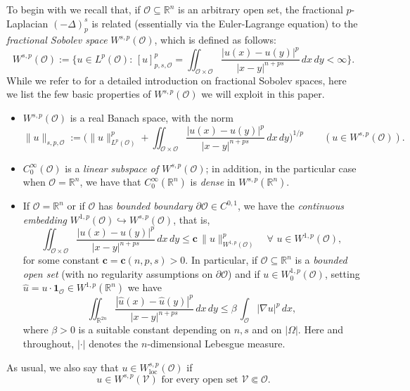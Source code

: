 \documentclass[11pt,a4paper]{amsart}
\def \R {\mathbb{R}}
\def \Oo {\mathcal{O}}
\theoremstyle{definition}
\theoremstyle{plain}
\numberwithin{equation}{section}
\begin{document}
To begin with we recall that, if $\mathcal{O}\subseteq\R^n$ is an arbitrary open set,
the {fractional $p$-Laplacian} $(-\Delta)_p^s$ is related
(essentially via the Euler-Lagrange equation)
to the \emph{fractional Sobolev space} $W^{s,p}(\Oo)$, which is defined as follows:
$$W^{s,p}(\Oo) := \Big\{u\in L^p(\Oo):\,[u]^p_{p,s,\Oo} = \iint_{\Oo\times\Oo}
\frac{|u(x)-u(y)|^p}{|x-y|^{n+ps}}\,dx\,dy < \infty\Big\}.$$
While we refer to \cite{LeoniFract} for a detailed introduction
on fractional Sobolev spaces, here we list the few basic properties of $W^{s,p}(\Oo)$
we will exploit in this paper.
\begin{itemize}
 \item[a)] $W^{s,p}(\Oo)$ is a real Banach space, with the norm
 $$\|u\|_{s,p,\Oo}
 := \Big(\|u\|^p_{L^p(\Oo)}+\iint_{\Oo\times\Oo}\frac{|u(x)-u(y)|^p}{|x-y|^{n+ps}}\,dx\,dy\Big)^{1/p}\qquad
 (u\in W^{s,p}(\Oo)).$$ 
 
 \item[b)] $C_0^\infty(\Oo)$ is a \emph{linear subspace of $W^{s,p}(\Oo)$}; in addition,
 in the particular case when $\Oo = \R^n$, we have that
  $C_0^\infty(\R^n)$ is \emph{dense} in $W^{s,p}(\R^n)$.
 \vspace*{0.1cm}
 
 \item[c)] If $\Oo = \R^n$ or if $\Oo$ has \emph{bounded boundary $\partial\Oo\in C^{0,1}$},
 we have the \emph{continuous embedding} $W^{1,p}(\Oo) \hookrightarrow W^{s,p}(\Oo)$,
 that is, 
 \begin{equation} \label{eq:H1embeddingHs}
  \iint_{\Oo\times\Oo}\frac{|u(x)-u(y)|^p}{|x-y|^{n+ps}}\,dx\,dy \leq 
  \mathbf{c}\,\|u\|^p_{W^{1,p}(\Oo)}\quad\text{$\forall\,\,u\in W^{1,p}(\Oo)$},
 \end{equation}
 for some constant $\mathbf{c} = \mathbf{c}(n,p,s) > 0$.
  In particular, if $\Oo\subseteq\R^n$ is a
  \emph{bounded open set} (with no regularity as\-sump\-tions on $\partial\Oo$) and
  if $u\in W_0^{1,p}(\Oo)$, set\-ting $\hat{u} = u\cdot\mathbf{1}_\Oo\in W^{1,p}(\R^n)$ we have
  \begin{equation} \label{eq:H01embeddingHs}
  \iint_{\R^{2n}}\frac{|\hat{u}(x)-\hat{u}(y)|^p}{|x-y|^{n+ps}}\,dx\,dy \leq 
  \beta\,\int_\Oo|\nabla u|^p\,dx,
 \end{equation}
 where $\beta > 0$ is a suitable constant depending on $n,s$ and on $|\Omega|$. Here
 and throughout,  $|\cdot|$ denotes the $n$-dimensional Lebesgue measure.
\end{itemize}
As usual, we also say that $u\in W^{s,p}_{\mathrm{loc}}(\Oo)$ if
$$\text{$u\in W^{s,p}(\mathcal{V})$ for every open set $\mathcal{V}\Subset\Oo$}.$$
\end{document}
